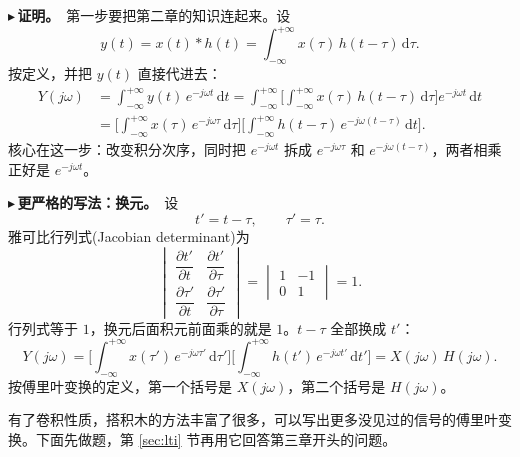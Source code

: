 \documentclass[UTF8,a4paper,11pt]{ctexart}
\newcommand{\dd}{\mathrm{d}}
\newcounter{ex}[section]
\newcommand{\point}[1]{\par\addvspace{1ex}\noindent\textcolor{ptteal}{$\blacktriangleright$\,\textbf{#1}}\ }
\begin{document}
\point{证明。}第一步要把第二章的知识连起来。设
\[
y(t)=x(t)*h(t)=\int_{-\infty}^{+\infty}x(\tau)\,h(t-\tau)\,\dd\tau .
\]
按定义，并把 $y(t)$ 直接代进去：
\[
\begin{aligned}
Y(j\omega)&=\int_{-\infty}^{+\infty}y(t)\,e^{-j\omega t}\,\dd t
=\int_{-\infty}^{+\infty}\Big[\int_{-\infty}^{+\infty}x(\tau)\,h(t-\tau)\,\dd\tau\Big]e^{-j\omega t}\,\dd t\\
&=\Big[\int_{-\infty}^{+\infty}x(\tau)\,e^{-j\omega\tau}\,\dd\tau\Big]\Big[\int_{-\infty}^{+\infty}h(t-\tau)\,e^{-j\omega(t-\tau)}\,\dd t\Big].
\end{aligned}
\]
核心在这一步：改变积分次序，同时把 $e^{-j\omega t}$ 拆成 $e^{-j\omega\tau}$ 和 $e^{-j\omega(t-\tau)}$，两者相乘正好是 $e^{-j\omega t}$。

\point{更严格的写法：换元。}设
\[
t'=t-\tau,\qquad \tau'=\tau .
\]
雅可比行列式(Jacobian determinant)为
\[
\begin{vmatrix}\dfrac{\partial t'}{\partial t}&\dfrac{\partial t'}{\partial\tau}\\[2ex]\dfrac{\partial\tau'}{\partial t}&\dfrac{\partial\tau'}{\partial\tau}\end{vmatrix}
=\begin{vmatrix}1&-1\\0&1\end{vmatrix}=1 .
\]
行列式等于 $1$，换元后面积元前面乘的就是 $1$。$t-\tau$ 全部换成 $t'$：
\[
Y(j\omega)=\Big[\int_{-\infty}^{+\infty}x(\tau')\,e^{-j\omega\tau'}\,\dd\tau'\Big]\Big[\int_{-\infty}^{+\infty}h(t')\,e^{-j\omega t'}\,\dd t'\Big]=X(j\omega)\,H(j\omega).
\]
按傅里叶变换的定义，第一个括号是 $X(j\omega)$，第二个括号是 $H(j\omega)$。

有了卷积性质，搭积木的方法丰富了很多，可以写出更多没见过的信号的傅里叶变换。下面先做题，第 \ref{sec:lti} 节再用它回答第三章开头的问题。
\end{document}
